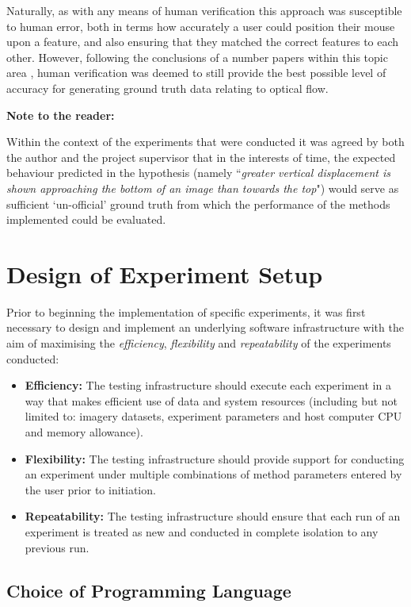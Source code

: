 Naturally, as with any means of human verification this approach was susceptible to human error, both in terms how accurately a user could position their mouse upon a feature, and also ensuring that they matched the correct features to each other. However, following the conclusions of a number papers within this topic area \cite{kondermann} \cite{haltakov} \cite{}, human verification was deemed to still provide the best possible level of accuracy for generating ground truth data relating to optical flow.

\textbf{Note to the reader:}

Within the context of the experiments that were conducted it was agreed by both the author and the project supervisor that in the interests of time, the expected behaviour predicted in the hypothesis (namely  ``\textit{greater vertical displacement is shown approaching the bottom of an image than towards the top}") would serve as sufficient `un-official' ground truth from which the performance of the methods implemented could be evaluated.

\section{Design of Experiment Setup}

Prior to beginning the implementation of specific experiments, it was first necessary to design and implement an underlying software infrastructure with the aim of maximising the \textit{efficiency}, \textit{flexibility} and \textit{repeatability} of the experiments conducted:

\begin{itemize}
	\item \textbf{Efficiency:} The testing infrastructure should execute each experiment in a way that makes efficient use of data and system resources (including but not limited to: imagery datasets, experiment parameters and host computer CPU and memory allowance).
	\item \textbf{Flexibility:} The testing infrastructure should provide support for conducting an experiment under multiple combinations of method parameters entered by the user prior to initiation.  
	\item \textbf{Repeatability:} The testing infrastructure should ensure that each run of an experiment is treated as new and conducted in complete isolation to any previous run. 
\end{itemize}

\subsection{Choice of Programming Language}

